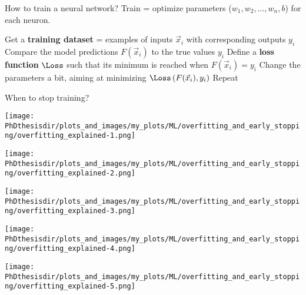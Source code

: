 \begin{frame}{How to train a neural network?}
Train = optimize parameters ($w_1, w_2, \ldots, w_n, b$) for each neuron.

\manip Get a \textbf{training dataset} = examples of inputs $\vec{x}_i$ with corresponding outputs $y_i$
\manip Compare the model predictions $F(\vec{x}_i)$ to the true values $y_i$
\submanip Define a \textbf{loss function} $\Loss$ such that its minimum is reached when $F(\vec{x}_i) = y_i$
\submanip Change the parameters a bit, aiming at minimizing $\Loss\left( F(\vec{x}_i), y_i \right)$
\submanip Repeat
\begin{center}
When to stop training?
\end{center}

\end{frame}

\begin{frame}
\begin{center}
\texttt{[image: \\PhDthesisdir/plots\_and\_images/my\_plots/ML/overfitting\_and\_early\_stopping/overfitting\_explained-1.png]}
\end{center}
\end{frame}
\begin{frame}\addtocounter{framenumber}{-1}
\begin{center}
\texttt{[image: \\PhDthesisdir/plots\_and\_images/my\_plots/ML/overfitting\_and\_early\_stopping/overfitting\_explained-2.png]}
\end{center}
\end{frame}
\begin{frame}\addtocounter{framenumber}{-1}
\begin{center}
\texttt{[image: \\PhDthesisdir/plots\_and\_images/my\_plots/ML/overfitting\_and\_early\_stopping/overfitting\_explained-3.png]}
\end{center}
\end{frame}
\begin{frame}\addtocounter{framenumber}{-1}
\begin{center}
\texttt{[image: \\PhDthesisdir/plots\_and\_images/my\_plots/ML/overfitting\_and\_early\_stopping/overfitting\_explained-4.png]}
\end{center}
\end{frame}
\begin{frame}\addtocounter{framenumber}{-1}
\begin{center}
\texttt{[image: \\PhDthesisdir/plots\_and\_images/my\_plots/ML/overfitting\_and\_early\_stopping/overfitting\_explained-5.png]}
\end{center}
\end{frame}


